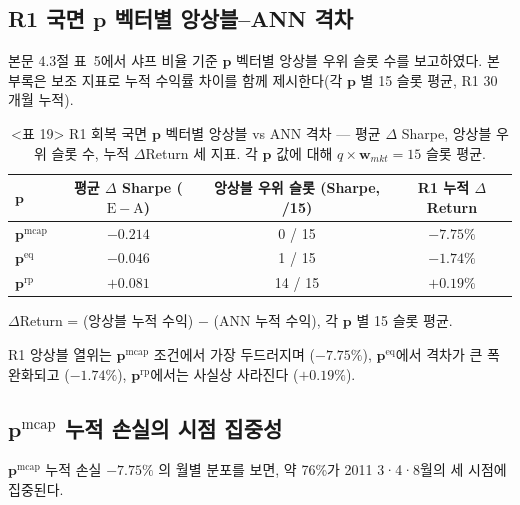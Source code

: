 \documentclass{article}
\begin{document}
\subsection{R1 국면 $\mathbf{p}$ 벡터별 앙상블--ANN 격차}

본문 4.3절 표~5에서 샤프 비율 기준 $\mathbf{p}$ 벡터별 앙상블 우위 슬롯 수를 보고하였다. 본 부록은 보조 지표로 누적 수익률 차이를 함께 제시한다(각 $\mathbf{p}$ 별 15 슬롯 평균, R1 30 개월 누적).

\begin{table}[ht]
\centering
\caption{<표 19> R1 회복 국면 $\mathbf{p}$ 벡터별 앙상블 vs ANN 격차 — 평균 $\Delta$ Sharpe,
앙상블 우위 슬롯 수, 누적 $\Delta$Return 세 지표.
각 $\mathbf{p}$ 값에 대해 $q \times \mathbf{w}_{mkt} = 15$ 슬롯 평균.}
\label{tab:r1_pmatrix_delta}
\setlength{\tabcolsep}{8pt}
\renewcommand{\arraystretch}{1.2}
\small
\begin{tabular}{lccc}
\toprule
$\mathbf{p}$ & 평균 $\Delta$ Sharpe ($\mathrm{E} - \mathrm{A}$) & 앙상블 우위 슬롯 (Sharpe, /15) & R1 누적 $\Delta$Return \\
\midrule
$\mathbf{p}^{\mathrm{mcap}}$ & $-0.214$ & 0 / 15  & $-7.75\%$ \\
$\mathbf{p}^{\mathrm{eq}}$   & $-0.046$ & 1 / 15  & $-1.74\%$ \\
$\mathbf{p}^{\mathrm{rp}}$   & $+0.081$ & 14 / 15 & $+0.19\%$ \\
\bottomrule
\end{tabular}
\par\smallskip
\footnotesize
\raggedright
$\Delta$Return = (앙상블 누적 수익) $-$ (ANN 누적 수익), 각 $\mathbf{p}$ 별 15 슬롯 평균.
\end{table}

R1 앙상블 열위는 $\mathbf{p}^{\mathrm{mcap}}$ 조건에서 가장 두드러지며 ($-7.75\%$), $\mathbf{p}^{\mathrm{eq}}$에서 격차가 큰 폭 완화되고 ($-1.74\%$), $\mathbf{p}^{\mathrm{rp}}$에서는 사실상 사라진다 ($+0.19\%$).

\subsection{$\mathbf{p}^{\mathrm{mcap}}$ 누적 손실의 시점 집중성}

$\mathbf{p}^{\mathrm{mcap}}$ 누적 손실 $-7.75\%$ 의 월별 분포를 보면, 약 76\%가 2011  3·4·8월의 세 시점에 집중된다.
\end{document}
